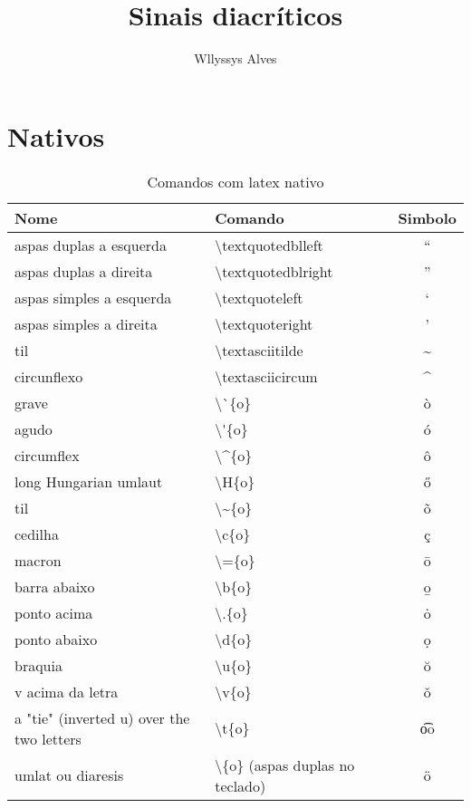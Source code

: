 \documentclass{article}
\title{Sinais diacríticos}
\date{\the\year}
\author{Wllyssys Alves}
\begin{document}
\maketitle

\section{Nativos}

\begin{table}[h]
\centering
\begin{tabular}{l|l|c}

\hline
\textbf{Nome} & \textbf{Comando} & \textbf{Simbolo} \\ 										%
\hline                                    			 														%

aspas duplas a esquerda	& \textbackslash textquotedblleft	& \textquotedblleft \\
aspas duplas a direita		& \textbackslash textquotedblright	& \textquotedblright \\
aspas simples a esquerda	& \textbackslash textquoteleft		& \textquoteleft \\
aspas simples a direita		& \textbackslash textquoteright		& \textquoteright \\
til 						& \textbackslash textasciitilde		& \textasciitilde \\
circunflexo				& \textbackslash textasciicircum		& \textasciicircum \\ \hline
grave					& \textbackslash\`{}\{o\}			& \`{o} \\
agudo					& \textbackslash\'{}\{o\}			& \'{o} \\
circumflex				& \textbackslash\^{}\{o\}			& \^{o} \\
long Hungarian umlaut		& \textbackslash H\{o\}				& \H{o} \\
til 						& \textbackslash\~{}\{o\}			& \~{o} \\
cedilha					& \textbackslash c\{o\}				& \c{c} \\
macron					& \textbackslash=\{o\}				& \={o} \\
barra abaixo 				& \textbackslash b\{o\}				& \b{o} \\
ponto acima				& \textbackslash .\{o\}				& \.{o} \\
ponto abaixo				& \textbackslash d\{o\}				& \d{o} \\
braquia					& \textbackslash u\{o\}				& \u{o} \\
v acima da letra			& \textbackslash v\{o\}				& \v{o} \\
a "tie" (inverted u) over the two letters	&	\textbackslash t\{o\}	& \t{oo} \\
umlat ou diaresis			& \textbackslash \textacutedbl\{o\} (aspas duplas no teclado)			&  \"{o} \\

\end{tabular}
\vspace{0.5cm}
\caption{Comandos com latex nativo}
\end{table}


\end{document}
